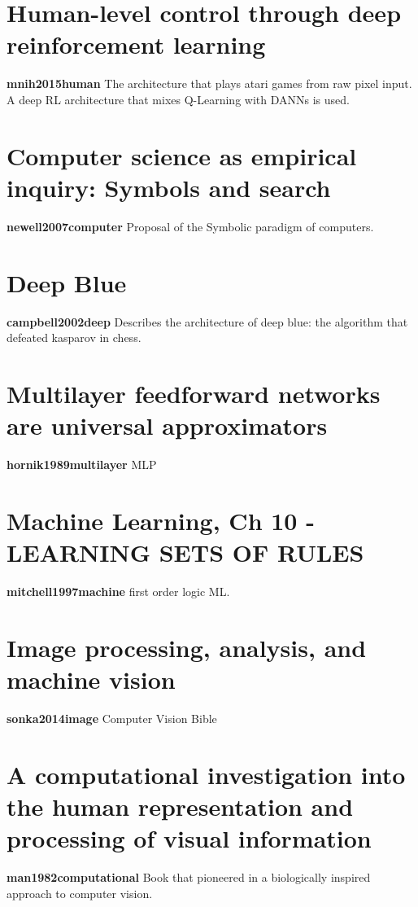 \documentclass{article}
\begin{document}
\section{Human-level control through deep reinforcement learning}
\textbf{mnih2015human} \cite{mnih2015human}\newline
The architecture that plays atari games from raw pixel input. A deep RL architecture that mixes Q-Learning with DANNs is used.


\section{Computer science as empirical inquiry: Symbols and search}
\textbf{newell2007computer} \cite{newell2007computer}\newline
Proposal of the Symbolic paradigm of computers.

\section{Deep Blue}
\textbf{campbell2002deep} \cite{campbell2002deep}\newline
Describes the architecture of deep blue: the algorithm that defeated kasparov in chess.

\section{Multilayer feedforward networks are universal approximators}
\textbf{hornik1989multilayer} \cite{hornik1989multilayer}\newline
MLP

\section{Machine Learning, Ch 10 - LEARNING SETS OF RULES }
\textbf{mitchell1997machine} \cite{mitchell1997machine}\newline
first order logic ML.

\section{Image processing, analysis, and machine vision }
\textbf{sonka2014image} \cite{sonka2014image}\newline
Computer Vision Bible

\section{A computational investigation into the human representation and processing of visual information}
\textbf{man1982computational} \cite{man1982computational}\newline
Book that pioneered in a biologically inspired approach to computer vision.

 

\end{document}
